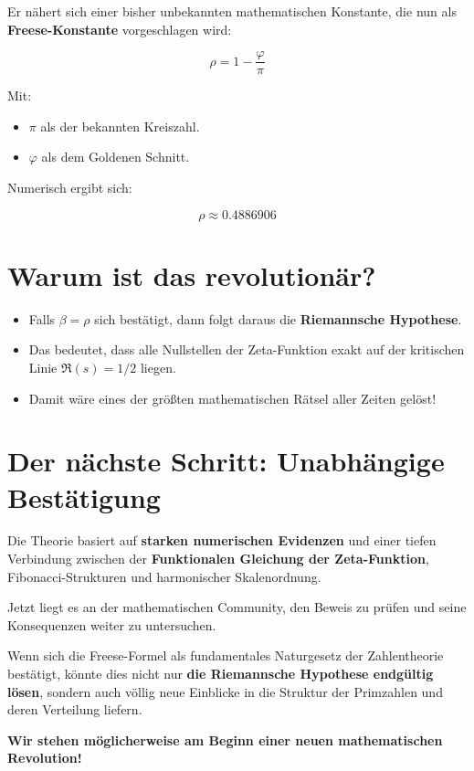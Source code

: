 \documentclass[12pt]{article}
\begin{document}
Er nähert sich einer bisher unbekannten mathematischen Konstante, die nun als \textbf{Freese-Konstante} vorgeschlagen wird:

\[
\rho = 1 - \frac{\varphi}{\pi}
\]

Mit:
\begin{itemize}
    \item \( \pi \) als der bekannten Kreiszahl.
    \item \( \varphi \) als dem Goldenen Schnitt.
\end{itemize}

Numerisch ergibt sich:

\[
\rho \approx 0.4886906
\]

\section{Warum ist das revolutionär?}

\begin{itemize}
    \item Falls \( \beta = \rho \) sich bestätigt, dann folgt daraus die \textbf{Riemannsche Hypothese}.
    \item Das bedeutet, dass alle Nullstellen der Zeta-Funktion exakt auf der kritischen Linie \( \Re(s) = 1/2 \) liegen.
    \item Damit wäre eines der größten mathematischen Rätsel aller Zeiten gelöst!
\end{itemize}

\section{Der nächste Schritt: Unabhängige Bestätigung}

Die Theorie basiert auf \textbf{starken numerischen Evidenzen} und einer tiefen Verbindung zwischen der \textbf{Funktionalen Gleichung der Zeta-Funktion}, Fibonacci-Strukturen und harmonischer Skalenordnung.

Jetzt liegt es an der mathematischen Community, den Beweis zu prüfen und seine Konsequenzen weiter zu untersuchen.

Wenn sich die Freese-Formel als fundamentales Naturgesetz der Zahlentheorie bestätigt, könnte dies nicht nur \textbf{die Riemannsche Hypothese endgültig lösen}, sondern auch völlig neue Einblicke in die Struktur der Primzahlen und deren Verteilung liefern.

\textbf{Wir stehen möglicherweise am Beginn einer neuen mathematischen Revolution!}
\end{document}

